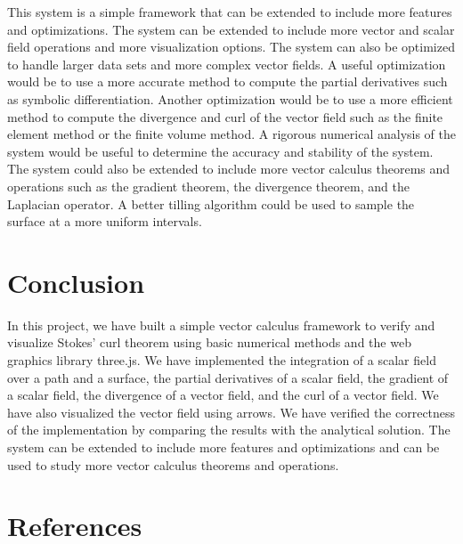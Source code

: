 \documentclass[12pt]{article}
\begin{document}
This system is a simple framework that can be extended to include more features and optimizations. The system can be extended to include more vector and scalar field operations and more visualization options. The system can also be optimized to handle larger data sets and more complex vector fields.
A useful optimization would be to use a more accurate method to compute the partial derivatives such as symbolic differentiation. Another optimization would be to use a more efficient method to compute the divergence and curl of the vector field such as the finite element method\cite{FEM} or the finite volume method\cite{Finite_Volume_Methods}.
A rigorous numerical analysis of the system would be useful to determine the accuracy and stability of the system. The system could also be extended to include more vector calculus theorems and operations such as the gradient theorem, the divergence theorem, and the Laplacian operator.
A better tilling algorithm could be used to sample the surface at a more uniform intervals.


\newpage
\section{Conclusion}

In this project, we have built a simple vector calculus framework to verify and visualize Stokes' curl theorem using basic numerical methods and the web graphics library three.js. We have implemented the integration of a scalar field over a path and a surface, the partial derivatives of a scalar field, the gradient of a scalar field, the divergence of a vector field, and the curl of a vector field. We have also visualized the vector field using arrows. We have verified the correctness of the implementation by comparing the results with the analytical solution. The system can be extended to include more features and optimizations and can be used to study more vector calculus theorems and operations.

\newpage
\section{References}


\end{document}
